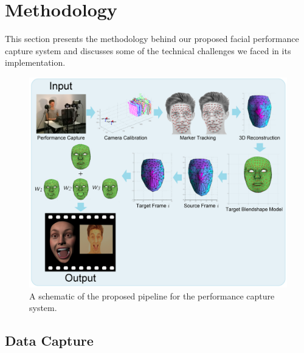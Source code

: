 \chapter{Methodology}
\label{sec:methods}

This section presents the methodology behind our proposed facial performance capture system and discusses some of the technical challenges we faced in its implementation.

\begin{figure}[htbp!]
\centering
\includegraphics[width=\textwidth]{img/pipeline1}
	\caption{A schematic of the proposed pipeline for the performance capture system.}
	\label{fig:pipeline1}
\end{figure}

\section{Data Capture} 
\label{sec:datacapture}

